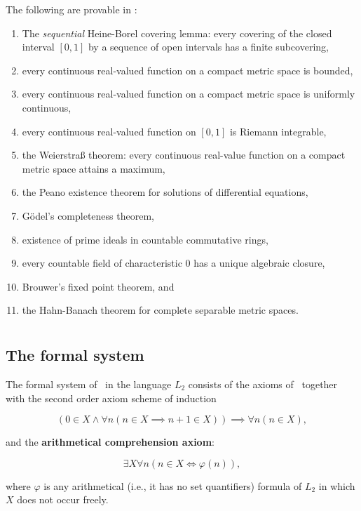 \documentclass[../main.tex]{memoir}
\begin{document}
\begin{theorem}
  The following are provable in \wkl:

  \begin{enumerate}
  \item The \textit{sequential} Heine-Borel covering lemma: every covering of the closed interval $[0, 1]$ by a sequence of open intervals has a finite subcovering,
  \item every continuous real-valued function on a compact metric space is bounded,
  \item every continuous real-valued function on a compact metric space is uniformly continuous,
  \item every continuous real-valued function on $[0, 1]$ is Riemann integrable,
  \item the Weierstra{\ss} theorem: every continuous real-value function on a compact metric space attains a maximum,
  \item the Peano existence theorem for solutions of differential equations,
  \item Gödel's completeness theorem,
  \item existence of prime ideals in countable commutative rings,
  \item every countable field of characteristic $0$ has a unique algebraic closure,
  \item Brouwer's fixed point theorem, and
  \item the Hahn-Banach theorem for complete separable metric spaces.
  \end{enumerate}
\end{theorem}

\section{\aca}

\subsection{The formal system}

\begin{definition}
  The formal system of \aca\ in the language $L_2$ consists of the axioms of \rca\ together with the second order axiom scheme of induction

  \[ (0 \in X \land \forall n (n \in X \implies n + 1 \in X)) \implies \forall n (n \in X), \]

  and the \textbf{arithmetical comprehension axiom}:

  \[ \exists X \forall n (n \in X \iff \varphi(n)), \]

  where $\varphi$ is any arithmetical (i.e., it has no set quantifiers) formula of $L_2$ in which $X$ does not occur freely.
\end{definition}
\end{document}
